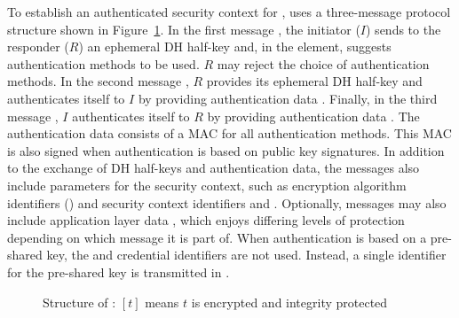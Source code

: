  
%
To establish an authenticated security context for \mOscore,
\mEdhoc{} uses a three-message protocol structure
shown in Figure~\ref{fig:edhocFramework}.
%
In the first message \mMsgone{}, the initiator ($I$) sends to the responder ($R$) an
ephemeral DH half-key \mGx{} and, in the \mMethod{} element, suggests
authentication methods to be used.
%
$R$ may reject the choice of authentication methods.
%
In the second message \mMsgtwo{}, $R$ provides its ephemeral
DH half-key \mGy{} and authenticates itself to $I$ by
providing authentication data \mAuthr{}.
%
Finally, in the third message \mMsgthree{}, $I$ authenticates itself
to $R$ by providing authentication data \mAuthi{}.
%
The authentication data consists of a MAC for all authentication methods.
%
This MAC is also signed when authentication is based on public key signatures.
%
In addition to the exchange of DH half-keys and authentication data, the
messages also include parameters for the \mOscore{} security context, such as
encryption algorithm identifiers (\mSuites{}) and \mOscore{} security context
identifiers \mCi{} and \mCr{}.
%
Optionally, messages may also include application layer data \mAD{}, which
enjoys differing levels of protection depending on which message it is part of.
%
When authentication is based on
a pre-shared key, the \mCredi{} and \mCredr{} credential identifiers are not
used.
%
Instead, a single identifier for the pre-shared key is transmitted in \mMsgone{}.
%
\begin{figure}
\centering
{}
\caption{Structure of \mEdhoc{}: $[t]$ means $t$ is encrypted and integrity protected}
\label{fig:edhocFramework}
\end{figure}

